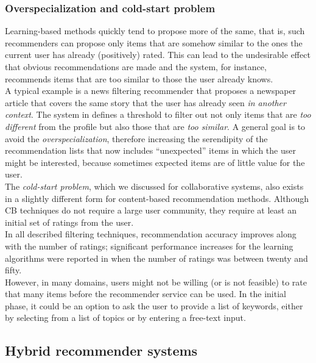 \subsubsection{Overspecialization and cold-start problem}
\label{overspecialization}

Learning-based methods quickly tend to propose more of the same, that
is, such recommenders can propose only items that are somehow similar
to the ones the current user has already (positively) rated. This can
lead to the undesirable effect that obvious recommendations are made
and the system, for instance, recommends items that are too similar to
those the user already knows.\\ A typical example is a news filtering
recommender that proposes a newspaper article that covers the same
story that the user has already seen \textit{in another context}. The
system in \cite{billsus1999personal}  defines a threshold to filter
out not only items that are \textit{too different} from the profile
but also those that are \textit{too similar}. A general goal is to
avoid the \textit{overspecialization}, therefore increasing the
serendipity of the recommendation lists that now includes “unexpected”
items in which the user might be interested, because sometimes
expected items are of little value for the user.\\
The \textit{cold-start problem}, which we discussed for collaborative
systems, also exists in a slightly different form for content-based
recommendation methods. Although CB techniques do not
require a large user community, they require at least an initial set
of ratings from the user. \\In all described filtering techniques,
recommendation accuracy improves along with the number of ratings;
significant performance increases for the learning algorithms were
reported in \cite{pazzani1997learning}  when the number of ratings was
between twenty and fifty. \\ However, in many domains, users might not be
willing (or is not feasible) to rate that many items before the recommender 
service can be used. In the initial phase, it could be an option to ask 
the user to provide a list of keywords, either by selecting from a 
list of topics or by entering a free-text input.

\subsection{Hybrid recommender systems} 

